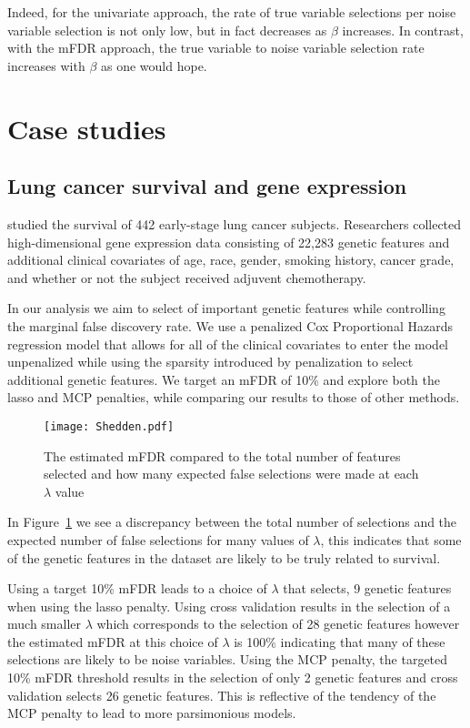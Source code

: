 Indeed, for the univariate approach, the rate of true variable selections per noise variable selection is not only low, but in fact decreases as $\beta$ increases. In contrast, with the mFDR approach, the true variable to noise variable selection rate increases with $\beta$ as one would hope.

\section{Case studies}

\subsection{Lung cancer survival and gene expression}
\citet{Shedden2008} studied the survival of 442 early-stage lung cancer subjects. Researchers collected high-dimensional gene expression data consisting of 22,283 genetic features and additional clinical covariates of age, race, gender, smoking history, cancer grade, and whether or not the subject received adjuvent chemotherapy.  

In our analysis we aim to select of important genetic features while controlling the marginal false discovery rate.  We use a penalized Cox Proportional Hazards regression model that allows for all of the clinical covariates to enter the model unpenalized while using the sparsity introduced by penalization to select additional genetic features.  We target an mFDR of 10\% and explore both the lasso and MCP penalties, while comparing our results to those of other methods.

\begin{figure} [!htb]
 \centering
  \texttt{[image: Shedden.pdf]}
  \caption{\label{Fig:Shedden} The estimated mFDR compared to the total number of features selected and how many expected false selections were made at each $\lambda$ value}
\end{figure}

In Figure~\ref{Fig:Shedden} we see a discrepancy between the total number of selections and the expected number of false selections for many values of $\lambda$, this indicates that some of the genetic features in the dataset are likely to be truly related to survival. 

Using a target 10\% mFDR leads to a choice of $\lambda$ that selects, 9 genetic features when using the lasso penalty. Using cross validation results in the selection of a much smaller $\lambda$ which corresponds to the selection of 28 genetic features however the estimated mFDR at this choice of $\lambda$ is 100\% indicating that many of these selections are likely to be noise variables. Using the MCP penalty, the targeted 10\% mFDR threshold results in the selection of only 2 genetic features and cross validation selects 26 genetic features. This is reflective of the tendency of the MCP penalty to lead to more parsimonious models.

